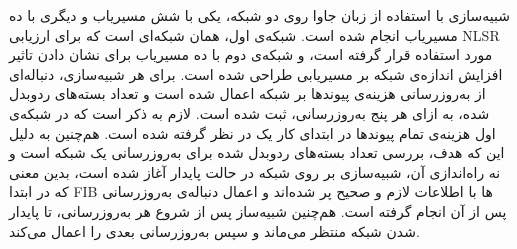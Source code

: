 شبیه‌سازی با استفاده از زبان جاوا روی دو شبکه‌، یکی با شش مسیریاب و دیگری با ده مسیریاب انجام شده است. شبکه‌ی اول، همان شبکه‌ای است که برای ارزیابی NLSR مورد استفاده قرار گرفته است، و شبکه‌ی دوم با ده مسیریاب برای نشان دادن تاثیر افزایش اندازه‌ی شبکه بر مسیریابی طراحی شده است. برای هر شبیه‌سازی، دنباله‌ای از به‌روزرسانی هزینه‌ی پیوندها بر شبکه اعمال شده است و تعداد بسته‌های ردوبدل شده، به ازای هر پنج به‌روزرسانی، ثبت شده است. لازم به ذکر است که در شبکه‌ی اول هزینه‌ی تمام پیوندها در ابتدای کار یک در نظر گرفته شده است. هم‌چنین به دلیل این که هدف، بررسی تعداد بسته‌های ردوبدل شده برای به‌روزرسانی یک شبکه است و نه راه‌اندازی آن، شبیه‌سازی بر روی شبکه در حالت پایدار آغاز شده است، بدین معنی که در ابتدا FIB ها با اطلاعات لازم و صحیح پر شده‌اند و اعمال دنباله‌ی به‌روزرسانی پس از آن انجام گرفته است. هم‌چنین شبیه‌ساز پس از شروع هر به‌روزرسانی، تا پایدار شدن شبکه منتظر می‌ماند و سپس به‌روزرسانی بعدی را اعمال می‌کند. 

